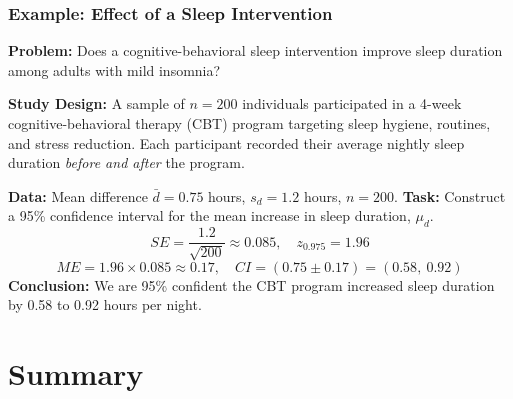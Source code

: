 \documentclass[handout]{beamer}
\begin{document}
\begin{frame}
\frametitle{Example: Effect of a Sleep Intervention}
\small
\textbf{Problem:} Does a cognitive-behavioral sleep intervention improve sleep duration among adults with mild insomnia?

\textbf{Study Design:} A sample of $n = 200$ individuals participated in a 4-week cognitive-behavioral therapy (CBT) program targeting sleep hygiene, routines, and stress reduction. Each participant recorded their average nightly sleep duration \textit{before and after} the program. \newline

\textbf{Data:} Mean difference $\bar{d} = 0.75$ hours, $s_d = 1.2$ hours, $n=200$. \newline
\textbf{Task:} Construct a 95\% confidence interval for the mean increase in sleep duration, $\mu_d$. \pause
\[
SE = \frac{1.2}{\sqrt{200}} \approx 0.085,\quad z_{0.975} = 1.96
\]
\[
ME = 1.96 \times 0.085 \approx 0.17,\quad CI = (0.75 \pm 0.17) = (0.58,\ 0.92)
\]
\textbf{Conclusion:} We are 95\% confident the CBT program increased sleep duration by 0.58 to 0.92 hours per night.
\end{frame}




\section{Summary}

\end{document}
